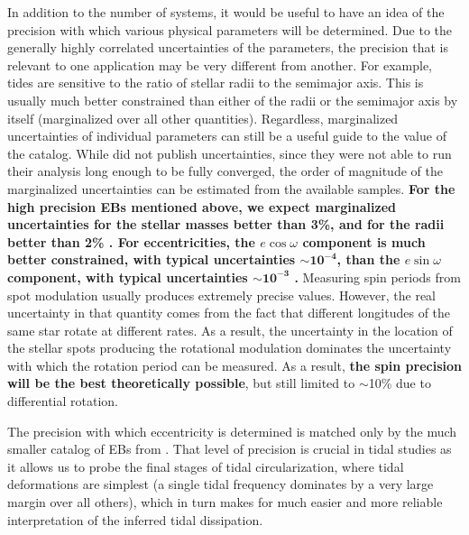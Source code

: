 In addition to the number of systems, it would be useful to have an idea of the
precision with which various physical parameters will be determined. Due to the
generally highly correlated uncertainties of the parameters, the precision that
is relevant to one application may be very different from another. For example,
tides are sensitive to the ratio of stellar radii to the semimajor axis. This is
usually much better constrained than either of the radii or the semimajor axis
by itself (marginalized over all other quantities). Regardless, marginalized
uncertainties of individual parameters can still be a useful guide to the value
of the catalog. While \citep{Justesen_Albrecht_21} did not publish
uncertainties, since they were not able to run their analysis long enough to be
fully converged, the order of magnitude of the marginalized uncertainties can be
estimated from the available samples. \textbf{For the high precision EBs
mentioned above, we expect marginalized uncertainties for the stellar masses
better than 3\%, and for the radii better than 2\% \citep[private
communication]{Justesen_Albrecht_21}. For eccentricities, the $e\cos\omega$
component is much better constrained, with typical uncertainties
$\mathbf{\sim10^{-4}}$, than the $e\sin\omega$ component, with typical
uncertainties $\mathbf{\sim10^{-3}}$ \citep{Justesen_Albrecht_21}.} Measuring
spin periods from spot modulation usually produces extremely precise values.
However, the real uncertainty in that quantity comes from the fact that
different longitudes of the same star rotate at different rates. As a result,
the uncertainty in the location of the stellar spots producing the rotational
modulation dominates the uncertainty with which the rotation period can be
measured. As a result, \textbf{the spin precision will be the best theoretically
possible}, but still limited to $\sim$10\% due to differential rotation.

The precision with which eccentricity is determined is matched only by the much
smaller catalog of EBs from \kepler{} \citep{Windemuth_et_al_19}. That level of
precision is crucial in tidal studies as it allows us to probe the final stages
of tidal circularization, where tidal deformations are simplest (a single tidal
frequency dominates by a very large margin over all others), which in turn makes
for much easier and more reliable interpretation of the inferred tidal
dissipation.
